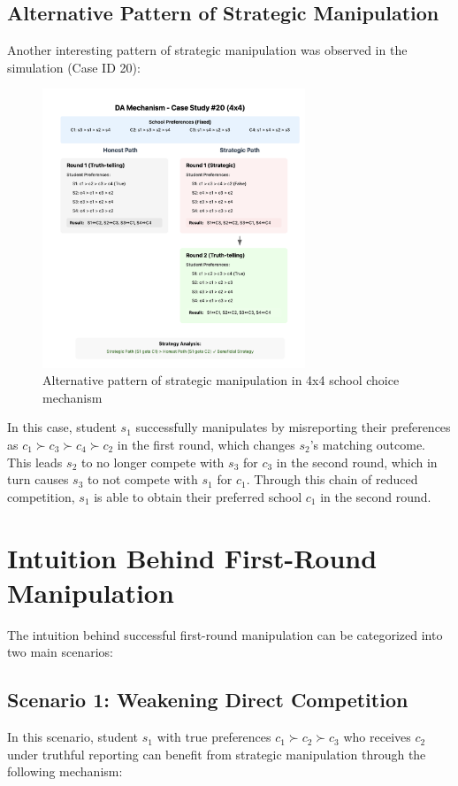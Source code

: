 \documentclass{article}
\begin{document}
\subsection{Alternative Pattern of Strategic Manipulation}
Another interesting pattern of strategic manipulation was observed in the simulation (Case ID 20):

\begin{figure}[h]
\centering
\includegraphics[width=0.7\textwidth]{4*4case2.png}
\caption{Alternative pattern of strategic manipulation in 4x4 school choice mechanism}
\end{figure}
In this case, student $s_1$ successfully manipulates by misreporting their preferences as $c_1 \succ c_3 \succ c_4 \succ c_2$ in the first round, which changes $s_2$'s matching outcome. This leads $s_2$ to no longer compete with $s_3$ for $c_3$ in the second round, which in turn causes $s_3$ to not compete with $s_1$ for $c_1$. Through this chain of reduced competition, $s_1$ is able to obtain their preferred school $c_1$ in the second round.


\section{Intuition Behind First-Round Manipulation}
The intuition behind successful first-round manipulation can be categorized into two main scenarios:

\subsection{Scenario 1: Weakening Direct Competition}
In this scenario, student $s_1$ with true preferences $c_1 \succ c_2 \succ c_3$ who receives $c_2$ under truthful reporting can benefit from strategic manipulation through the following mechanism:
\end{document}
